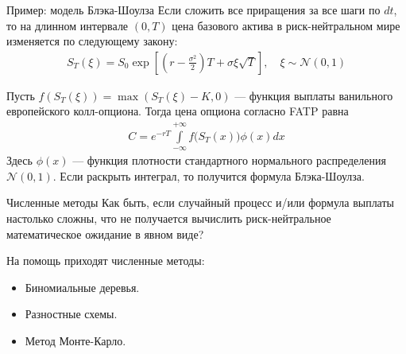 \documentclass{beamer}
\begin{document}
\begin{frame}{Пример: модель Блэка-Шоулза}
\justify
Если сложить все приращения за все шаги по $dt$, то на длинном интервале $(0, T)$ цена базового актива в риск-нейтральном мире изменяется по следующему закону:
\begin{align*}
S_T(\xi) = S_0\exp{\left[\left(r - \frac{\sigma^2}{2}\right)T + \sigma\xi\sqrt{T}\right]}, \quad \xi \sim \mathcal{N}(0, 1)
\end{align*}

\justify
Пусть $f(S_T(\xi)) = \max(S_T(\xi) - K, 0)$ --- функция выплаты ванильного европейского колл-опциона. Тогда цена опциона согласно FATP равна
\begin{align*}
C = e^{-rT} \int\limits_{-\infty}^{+\infty}f\Big(S_T(x)\Big)\phi(x)dx
\end{align*}
Здесь $\phi(x)$ --- функция плотности стандартного нормального распределения $\mathcal{N}(0,1)$. Если раскрыть интеграл, то получится формула Блэка-Шоулза.
\end{frame}



\begin{frame}{Численные методы}
\justify
Как быть, если случайный процесс и/или формула выплаты настолько сложны, что не получается вычислить риск-нейтральное математическое ожидание в явном виде?

\justify
На помощь приходят численные методы:
\begin{itemize}
\item Биномиальные деревья.
\item Разностные схемы.
\item Метод Монте-Карло.
\end{itemize}
\end{frame}
\end{document}
